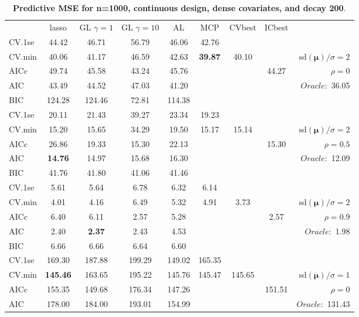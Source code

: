 \clearpage
\begin{table}\vspace{-.5cm}
\caption[l]{ { \bf Predictive MSE for n=1000, continuous design, 
dense covariates, and  decay  200}.}
\vspace{-.5cm}
\footnotesize{}
\begin{center}
\begin{tabular}{l*{7}{c}|r}
 & lasso & GL $\gamma=1$ & GL $\gamma=10$ & AL & MCP  & CVbest & ICbest  \\
\cline{1-9}
CV.1se & 44.42 & 46.71 & 56.79 & 46.06 & 42.76 & & & \\
CV.min & 40.06 & 41.17 & 46.59 & 42.63 & {\bf 39.87} & 40.10 & & $\mathrm{sd}(\mathbf{\mu})/\sigma=2$ \\
AICc & 49.74 & 45.58 & 43.24 & 45.76 & & & 44.27 &  $\rho=0$ \\
AIC & 43.49 & 44.52 & 47.03 & 41.20 & & & &  \multirow{2}{*}{$Oracle: $ 36.05} \\
BIC & 124.28 & 124.46 & 72.81 & 114.38 & & & &  \\
 \hline 
CV.1se & 20.11 & 21.43 & 39.27 & 23.34 & 19.23 & & & \\
CV.min & 15.20 & 15.65 & 34.29 & 19.50 & 15.17 & 15.14 & & $\mathrm{sd}(\mathbf{\mu})/\sigma=2$ \\
AICc & 26.86 & 19.33 & 15.30 & 22.13 & & & 15.30 &  $\rho=0.5$ \\
AIC & {\bf 14.76} & 14.97 & 15.68 & 16.30 & & & &  \multirow{2}{*}{$Oracle: $ 12.09} \\
BIC & 41.76 & 41.80 & 41.06 & 41.46 & & & &  \\
 \hline 
CV.1se & 5.61 & 5.64 & 6.78 & 6.32 & 6.14 & & & \\
CV.min & 4.01 & 4.16 & 6.49 & 5.32 & 4.91 & 3.73 & & $\mathrm{sd}(\mathbf{\mu})/\sigma=2$ \\
AICc & 6.40 & 6.11 & 2.57 & 5.28 & & & 2.57 &  $\rho=0.9$ \\
AIC & 2.40 & {\bf 2.37} & 2.43 & 4.53 & & & &  \multirow{2}{*}{$Oracle: $ 1.98} \\
BIC & 6.66 & 6.66 & 6.64 & 6.60 & & & &  \\
 \hline 
CV.1se & 169.30 & 187.88 & 199.29 & 149.02 & 165.35 & & & \\
CV.min & {\bf 145.46} & 163.65 & 195.22 & 145.76 & 145.47 & 145.65 & & $\mathrm{sd}(\mathbf{\mu})/\sigma=1$ \\
AICc & 155.35 & 149.68 & 176.34 & 147.26 & & & 151.51 &  $\rho=0$ \\
AIC & 178.00 & 184.00 & 193.01 & 154.99 & & & &  \multirow{2}{*}{$Oracle: $ 131.43} \\

\end{tabular}
\end{center}
\end{table}
